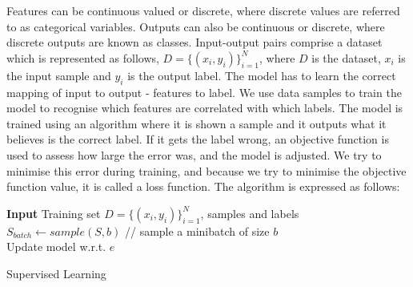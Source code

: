 Features can be continuous valued or discrete, where discrete values are referred to as categorical variables. Outputs can also be continuous or discrete, where discrete outputs are known as classes. Input-output pairs comprise a dataset which is represented as follows, \begin{math} D = \{(x_i, y_i)\}_{i=1}^N \end{math}, where \begin{math} D \end{math} is the dataset, \begin{math} x_i \end{math} is the input sample and \begin{math} y_i \end{math} is the output label. The model has to learn the correct mapping of input to output - features to label. We use data samples to train the model to recognise which features are correlated with which labels. The model is trained using an algorithm where it is shown a sample and it outputs what it believes is the correct label. If it gets the label wrong, an objective function is used to assess how large the error was, and the model is adjusted. We try to minimise this error during training, and because we try to minimise the objective function value, it is called a loss function. The algorithm is expressed as follows: \bigbreak

\begin{algorithm}[H]
	\SetAlgoLined
	\textbf{Input} 
	Training set \begin{math} D = \{(x_i, y_i)\}_{i=1}^N \end{math}, samples and labels\;
  	\begin{math} S_{batch} \gets sample(S, b) \end{math} // sample a minibatch of size \begin{math} b \end{math} \\
	Update model w.r.t. \begin{math}  e \end{math}
	\caption{Supervised Learning}
\end{algorithm} \bigbreak

